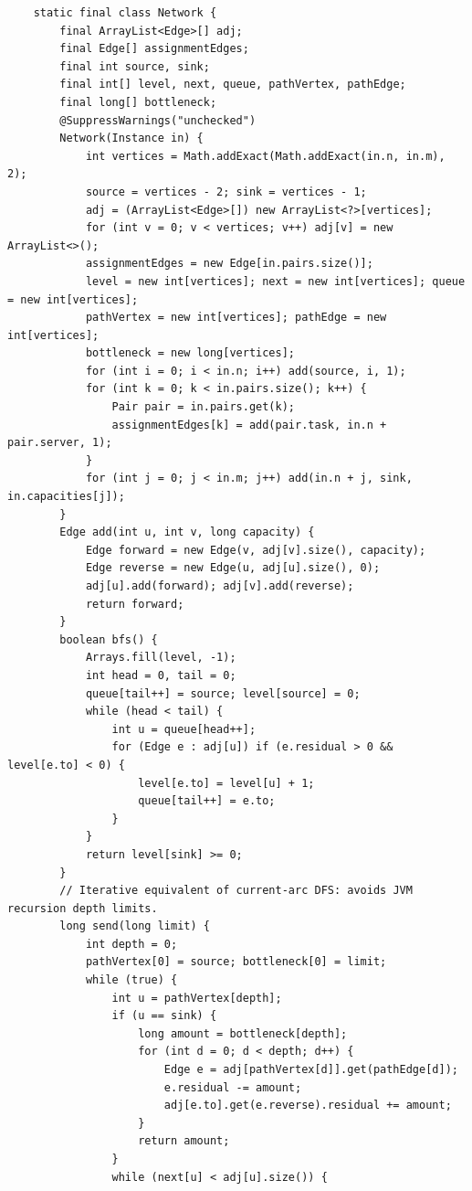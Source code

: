 \documentclass[conference]{IEEEtran}
\theoremstyle{definition}
\theoremstyle{remark}
\begin{document}
\begin{lstlisting}
    static final class Network {
        final ArrayList<Edge>[] adj;
        final Edge[] assignmentEdges;
        final int source, sink;
        final int[] level, next, queue, pathVertex, pathEdge;
        final long[] bottleneck;
        @SuppressWarnings("unchecked")
        Network(Instance in) {
            int vertices = Math.addExact(Math.addExact(in.n, in.m), 2);
            source = vertices - 2; sink = vertices - 1;
            adj = (ArrayList<Edge>[]) new ArrayList<?>[vertices];
            for (int v = 0; v < vertices; v++) adj[v] = new ArrayList<>();
            assignmentEdges = new Edge[in.pairs.size()];
            level = new int[vertices]; next = new int[vertices]; queue = new int[vertices];
            pathVertex = new int[vertices]; pathEdge = new int[vertices];
            bottleneck = new long[vertices];
            for (int i = 0; i < in.n; i++) add(source, i, 1);
            for (int k = 0; k < in.pairs.size(); k++) {
                Pair pair = in.pairs.get(k);
                assignmentEdges[k] = add(pair.task, in.n + pair.server, 1);
            }
            for (int j = 0; j < in.m; j++) add(in.n + j, sink, in.capacities[j]);
        }
        Edge add(int u, int v, long capacity) {
            Edge forward = new Edge(v, adj[v].size(), capacity);
            Edge reverse = new Edge(u, adj[u].size(), 0);
            adj[u].add(forward); adj[v].add(reverse);
            return forward;
        }
        boolean bfs() {
            Arrays.fill(level, -1);
            int head = 0, tail = 0;
            queue[tail++] = source; level[source] = 0;
            while (head < tail) {
                int u = queue[head++];
                for (Edge e : adj[u]) if (e.residual > 0 && level[e.to] < 0) {
                    level[e.to] = level[u] + 1;
                    queue[tail++] = e.to;
                }
            }
            return level[sink] >= 0;
        }
        // Iterative equivalent of current-arc DFS: avoids JVM recursion depth limits.
        long send(long limit) {
            int depth = 0;
            pathVertex[0] = source; bottleneck[0] = limit;
            while (true) {
                int u = pathVertex[depth];
                if (u == sink) {
                    long amount = bottleneck[depth];
                    for (int d = 0; d < depth; d++) {
                        Edge e = adj[pathVertex[d]].get(pathEdge[d]);
                        e.residual -= amount;
                        adj[e.to].get(e.reverse).residual += amount;
                    }
                    return amount;
                }
                while (next[u] < adj[u].size()) {

\end{lstlisting}
\end{document}
